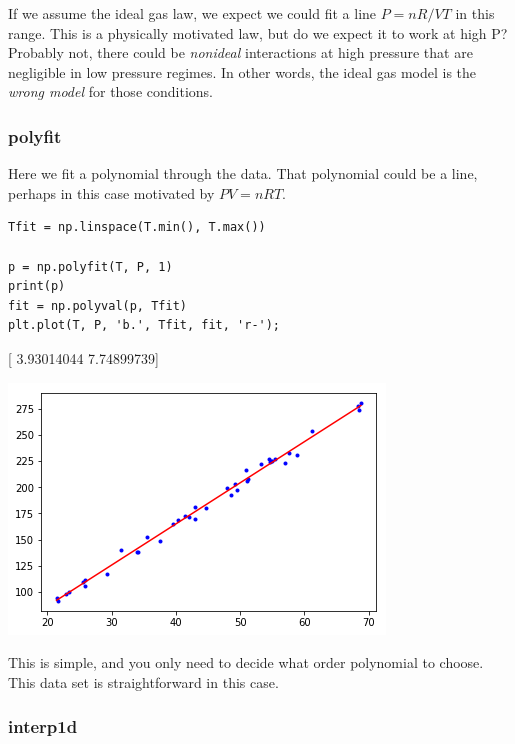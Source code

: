 \documentclass[11pt]{article}
\begin{document}
If we assume the ideal gas law, we expect we could fit a line \(P = nR/V T\) in this range. This is a physically motivated law, but do we expect it to work at high P? Probably not, there could be \emph{nonideal} interactions at high pressure that are negligible in low pressure regimes. In other words, the ideal gas model is the \emph{wrong model} for those conditions.

\subsubsection{polyfit}
\label{sec:orgc800b7b}

Here we fit a polynomial through the data. That polynomial could be a line, perhaps in this case motivated by \(PV = nRT\).

\begin{verbatim}
Tfit = np.linspace(T.min(), T.max())

p = np.polyfit(T, P, 1)
print(p)
fit = np.polyval(p, Tfit)
plt.plot(T, P, 'b.', Tfit, fit, 'r-');
\end{verbatim}

[ 3.93014044  7.74899739]



\begin{center}
\includegraphics[width=.9\linewidth]{obipy-resources/a10feaf5270288b4c795ebce6b64fde6-703046GQ.png}
\end{center}

This is simple, and you only need to decide what order polynomial to choose. This data set is straightforward in this case.

\subsubsection{interp1d}
\label{sec:org93a0e46}
\end{document}
